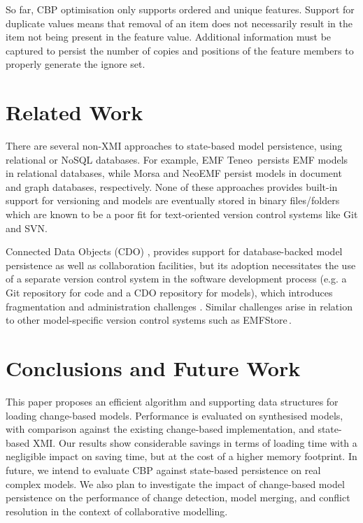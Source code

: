 \documentclass{llncs}
\begin{document}
    So far, CBP optimisation only supports ordered and unique features. Support for duplicate values means that removal of an item does not necessarily result in the item not being present in the feature value. Additional information must be captured to persist the number of copies and positions of the feature members to properly generate the ignore set. 
    
    \section{Related Work}
    \label{sec:related_work}
    
    There are several non-XMI approaches to  state-based model persistence, using relational or NoSQL databases. For example, EMF Teneo\,\cite{eclipse2017teneo} persists EMF models in relational databases, while Morsa \cite{pagan2011morsa} and NeoEMF \cite{daniel2016neoemf} persist models in document and graph databases, respectively.  None of these approaches provides built-in support for versioning and models are eventually stored in binary files/folders which are known to be a poor fit for text-oriented version control systems like Git and SVN.
    
    Connected Data Objects (CDO) \cite{eclipse2017cdo}, provides support for database-backed model persistence as well as collaboration facilities, but its adoption necessitates the use of a separate version control system in the software development process (e.g. a Git repository for code and a CDO repository for models), which introduces fragmentation and administration challenges \cite{barmpis2014evaluation}. Similar challenges arise in relation to other model-specific version control systems such as EMFStore\,\cite{koegel2010emfstore}.
    
    \section{Conclusions and Future Work}
    \label{sec:conclusions}
    This paper proposes an efficient algorithm and supporting data structures for loading change-based models.  Performance is evaluated on synthesised models, with comparison against the existing change-based implementation, and state-based XMI. 
    Our results show considerable savings in terms of loading time with a negligible impact on saving time, but at the cost of a higher memory footprint.  In future, we intend to evaluate CBP against state-based persistence on real complex models.  We also plan to investigate the impact of change-based model persistence on the performance of change detection, model merging, and conflict resolution in the context of collaborative modelling.
    
\end{document}
